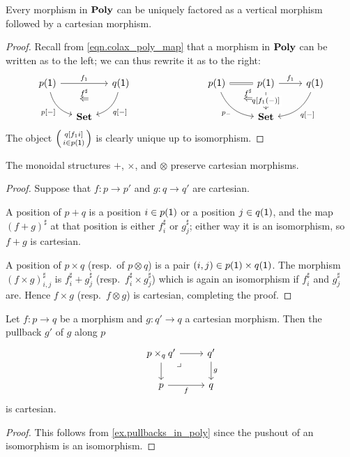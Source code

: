 \documentclass[DynamicalBook]{subfiles}
\begin{document}
\begin{proposition}\label{prop.vert_cart_factorization}
Every morphism in $\textbf{Poly}$ can be uniquely factored as a vertical morphism followed by a cartesian morphism.
\end{proposition}
\begin{proof}
Recall from \cref{eqn.colax_poly_map} that a morphism in $\textbf{Poly}$ can be written as to the left; we can thus rewrite it as to the right:
\[
\begin{tikzcd}[column sep=small]
	p(\1)\ar[dr, bend right, "{p[-]}"']\ar[rr, "f_1"]&~&
	q(\1)\ar[dl, bend left, "{q[-]}"]\\&
	\smset\ar[u, phantom, near end, "\overset{f^\sharp}{\Leftarrow}"]
\end{tikzcd}
\hspace{1in}
\begin{tikzcd}
	p(\1)\ar[dr, bend right, "p_-"']\ar[r, equal, ""' name=equal]&
	p(\1)\ar[d, "{q[f_1(-)]}" description]\ar[r, "f_1"]&
	q(\1)\ar[dl, bend left, "{q[-]}"]\\&
	|[alias=set]|\smset\ar[from=equal, to=set, pos=.3, phantom, "\overset{f^\sharp}{\Leftarrow}"]
\end{tikzcd}
\]
The object $\lens{q[f_1i]}{i\in p(\1)}$ is clearly unique up to isomorphism.
\end{proof}

\begin{proposition}\label{prop.monoidal_pres_carts}
The monoidal structures $+$, $\times$, and $\otimes$ preserve cartesian morphisms.
\end{proposition}
\begin{proof}
Suppose that  $f\colon p\to p'$ and $g\colon q\to q'$ are cartesian. 

A position of $p+q$ is a position $i\in p(\textsf{1})$ or a position $j\in q(\textsf{1})$, and the map $(f+g)^\sharp$ at that position is either $f^\sharp_i$ or $g^\sharp_j$; either way it is an isomorphism, so $f+g$ is cartesian.

A position of $p\times q$ (resp.\ of $p\otimes q$) is a pair $(i,j)\in p(\textsf{1})\times q(\textsf{1})$. The morphism $(f\times g)^\sharp_{i,j}$ is $f^\sharp_i+g^\sharp_j$ (resp.\ $f^\sharp_i\times g^\sharp_j$) which is again an isomorphism if $f^\sharp_i$ and $g^\sharp_j$ are. Hence $f\times g$ (resp.\ $f\otimes g$) is cartesian, completing the proof.
\end{proof}

\begin{proposition}\label{prop.pullback_cartesian}
Let $f\colon p\to q$ be a morphism and $g\colon q'\to q$ a cartesian morphism. Then the pullback $g'$ of $g$ along $p$
\[
\begin{tikzcd}
	p\times_qq'\ar[r]\ar[d]&
	q'\ar[d, "g"]\\
	p\ar[r, "f"']&
	q\ar[ul, phantom, very near end, "\lrcorner"]
\end{tikzcd}
\]
is cartesian.
\end{proposition}
\begin{proof}
This follows from \cref{ex.pullbacks_in_poly} since the pushout of an isomorphism is an isomorphism.
\end{proof}
\end{document}

